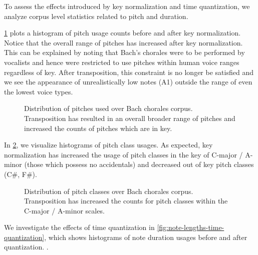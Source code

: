 To assess the effects introduced by key normalization and time quantization,
we analyze corpus level statistics related to pitch and duration.

\cref{fig:pitch-key-standardization} plots a histogram of pitch usage counts
before and after key normalization. Notice that the overall range of pitches
has increased after key normalization. This can be explained by noting that
Bach's chorales were to be performed by vocalists and hence were restricted to
use pitches within human voice ranges regardless of key. After transposition,
this constraint is no longer be satisfied and we see the appearance of
unrealistically low notes (\eg A1) outside the range of even the lowest voice
types.

\begin{landscape}
  \begin{figure}[p]
    \centering
    \begin{subfigure}[c]{1.0\textwidth}
        \centering
        
        
    \end{subfigure}
    \begin{subfigure}[c]{1.0\textwidth}
        \centering
        
        
    \end{subfigure}
    \caption{Distribution of pitches used over Bach chorales corpus.
      Transposition has resulted in an overall broader range of pitches and
    increased the counts of pitches which are in key.}
    \label{fig:pitch-key-standardization}
  \end{figure}
\end{landscape}

In \cref{fig:pc-key-standardization}, we visualize histograms of pitch class usages.
As expected, key normalization has increased the usage of pitch classes in the key of
C-major / A-minor (\ie those which possess no accidentals) and decreased out of key
pitch classes (\eg C\#, F\#).

\begin{figure}
    \centering
    \caption{Distribution of pitch classes over Bach chorales corpus. Transposition has increased the counts
    for pitch classes within the C-major / A-minor scales.}
    \label{fig:pc-key-standardization}
\end{figure}

We investigate the effects of time quantization in
\cref{fig:note-lengths-time-quantization}, which shows histograms of note
duration usages before and after quantization. .

